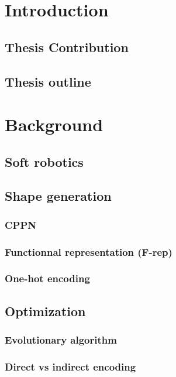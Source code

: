 \documentclass[pdftex, a4paper, 12pt]{report}
\begin{document}
            

            \tableofcontents

            \chapter{Introduction}
            \section{Thesis Contribution}
            \section{Thesis outline}
            
            \chapter{Background}
            \section{Soft robotics}
            
            \section{Shape generation}
            \subsection{CPPN}
            \subsection{Functionnal representation (F-rep)}
            \subsection{One-hot encoding}
            
            \section{Optimization}
            \subsection{Evolutionary algorithm}
            \subsection{Direct vs indirect encoding}
\end{document}
